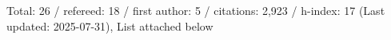 Total: 26 / refereed: 18 / first author: 5 / citations: 2,923 / h-index: 17 (Last updated: 2025-07-31), List attached below